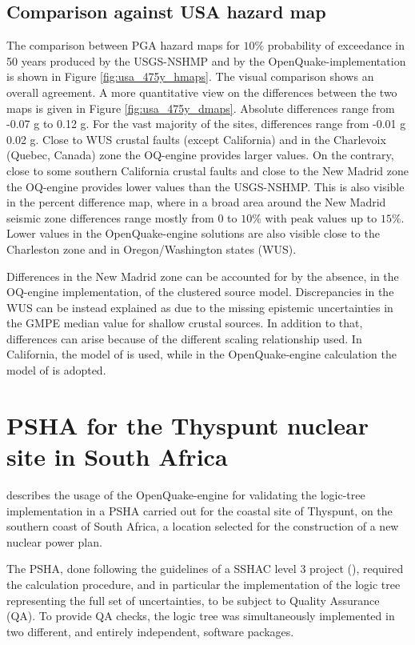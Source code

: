\subsection{Comparison against USA hazard map}
The comparison between PGA hazard maps for $10\%$ probability of exceedance in 50 years produced by the USGS-NSHMP and by the OpenQuake-implementation is shown in Figure \ref{fig:usa_475y_hmaps}. The visual comparison shows an overall agreement. A more quantitative view on the differences between the two maps is given in Figure \ref{fig:usa_475y_dmaps}. Absolute differences range from -0.07 g to 0.12 g. For the vast majority of the sites, differences range from -0.01 g 0.02 g. Close to WUS crustal faults (except California) and in the Charlevoix (Quebec, Canada) zone the OQ-engine provides larger values. On the contrary, close to some southern California crustal faults and close to the New Madrid zone the OQ-engine provides lower values than the USGS-NSHMP. This is also visible in the percent difference map, where in a broad area around the New Madrid seismic zone differences range mostly from $0$ to $10\%$ with peak values up to $15\%$. Lower values in the OpenQuake-engine solutions are also visible close to the Charleston zone and in Oregon/Washington states (WUS).

Differences in the New Madrid zone can be accounted for by the absence, in the OQ-engine implementation, of the clustered source model. Discrepancies in the WUS can be instead explained as due to the missing epistemic uncertainties in the GMPE median value for shallow crustal sources. In addition to that, differences can arise because of the different scaling relationship used. In California, the model of \cite{hanks2002} is used, while in the OpenQuake-engine calculation the model of \cite{wells1994} is adopted.

\section{PSHA for the Thyspunt nuclear site in South Africa}
\citet{bommer2013} describes the usage of the OpenQuake-engine for validating the logic-tree implementation in a PSHA carried out for the coastal site of Thyspunt, on the southern coast of South Africa, a location selected for the construction of a new nuclear power plan.

The PSHA, done following the guidelines of a SSHAC level 3 project (\cite{budnitz1997}), required the calculation procedure, and in particular the implementation of the logic tree representing the full set of uncertainties, to be subject to Quality Assurance (QA). To provide QA checks, the logic tree was simultaneously implemented in two different, and entirely independent, software packages.

